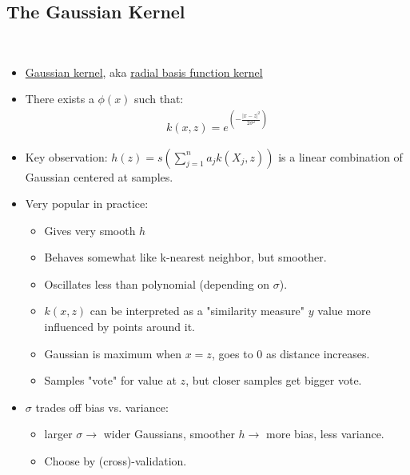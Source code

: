 \documentclass[10pt]{article}
\begin{document}
	\subsection*{The Gaussian Kernel}
	\
	\begin{itemize}
		\item \underline{Gaussian kernel}, aka \underline{radial basis function kernel}
		\item There exists a $\phi(x)$ such that:
			\begin{align*}
				k(x, z) = e^{(-\frac{|x-z|^{2}}{2\sigma^{2}})}
			\end{align*}
		\item Key observation: $h(z) = s(\sum_{j=1}^{n} a_{j}k(X_{j}, z))$ is a linear combination of Gaussian centered at samples.
		\item Very popular in practice:
			\begin{itemize}
				\item Gives very smooth $h$
				\item Behaves somewhat like k-nearest neighbor, but smoother.
				\item Oscillates less than polynomial (depending on $\sigma$).
				\item $k(x,z)$ can be interpreted as a "similarity measure" $y$ value more influenced by points around it.
				\item Gaussian is maximum when $x=z$, goes to 0 as distance increases.
				\item Samples "vote" for value at $z$, but closer samples get bigger vote.
			\end{itemize}
		\item $\sigma$ trades off bias vs. variance:
			\begin{itemize}
				\item larger $\sigma \rightarrow$ wider Gaussians, smoother $h \rightarrow$ more bias, less variance.
				\item Choose by (cross)-validation.
			\end{itemize}
	\end{itemize}
	
\end{document}
